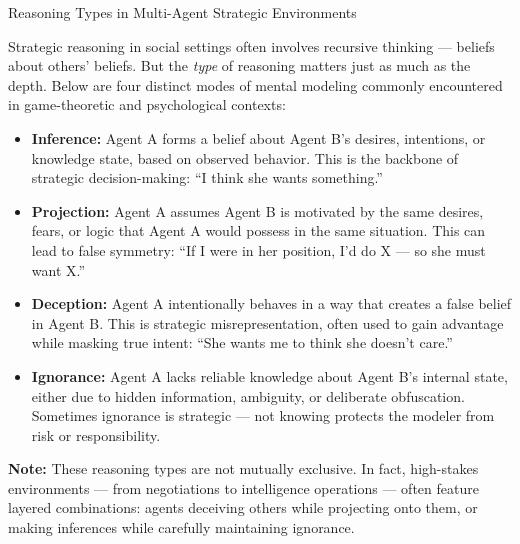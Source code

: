 \medskip

\begin{TechnicalSidebar}{Reasoning Types in Multi-Agent Strategic Environments}

    Strategic reasoning in social settings often involves recursive thinking — beliefs about others' beliefs. But the \emph{type} of reasoning matters just as much as the depth. Below are four distinct modes of mental modeling commonly encountered in game-theoretic and psychological contexts:
    
    \medskip

    \begin{itemize}
    
        \item \textbf{Inference:} Agent A forms a belief about Agent B’s desires, intentions, or knowledge state, based on observed behavior. This is the backbone of strategic decision-making: “I think she wants something.”
        \item \textbf{Projection:} Agent A assumes Agent B is motivated by the same desires, fears, or logic that Agent A would possess in the same situation. This can lead to false symmetry: “If I were in her position, I’d do X — so she must want X.”
        \item \textbf{Deception:} Agent A intentionally behaves in a way that creates a false belief in Agent B. This is strategic misrepresentation, often used to gain advantage while masking true intent: “She wants me to think she doesn’t care.”
        \item \textbf{Ignorance:} Agent A lacks reliable knowledge about Agent B’s internal state, either due to hidden information, ambiguity, or deliberate obfuscation. Sometimes ignorance is strategic — not knowing protects the modeler from risk or responsibility.
    
    \end{itemize}
    
    \medskip
    
    \textbf{Note:} These reasoning types are not mutually exclusive. In fact, high-stakes environments — from negotiations to intelligence operations — often feature layered combinations: agents deceiving others while projecting onto them, or making inferences while carefully maintaining ignorance.
    
\end{TechnicalSidebar}

\medskip









